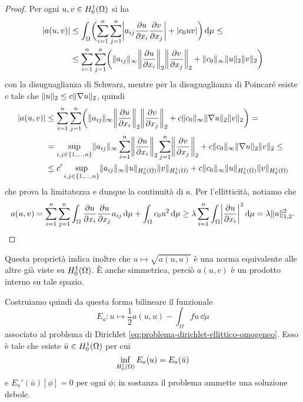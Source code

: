 \begin{proof}
    Per ogni $u,v\in\sobHc[1]{\Omega}$ si ha
    \begin{equation}
        \begin{split}
            \abs{a(u,v)}&\le
            \int_\Omega\biggl(\sum_{i=1}^n\sum_{j=1}^n\abs[\bigg]{a_{ij}\drp{u}{x_i}\drp{v}{x_j}}+\abs{c_0uv}\biggr)\,\dd\mu\le\\ &\le
            \sum_{i=1}^n\sum_{j=1}^n\biggl(\norm{a_{ij}}_\infty\norm[\bigg]{\drp{u}{x_i}}_2\norm[\bigg]{\drp{v}{x_j}}_2+\norm{c_0}_\infty\norm{u}_2\norm{v}_2\biggr)
        \end{split}
    \end{equation}
    con la disuguaglianza di Schwarz, mentre per la disuguaglianza di Poincar\'e esiste $c$ tale che $\norm{u}_2\le c\norm{\grad u}_2$, quindi
    \begin{equation}
        \begin{split}
            \abs{a(u,v)}&\le
            \sum_{i=1}^n\sum_{j=1}^n\biggl(\norm{a_{ij}}_\infty\norm[\bigg]{\drp{u}{x_i}}_2\norm[\bigg]{\drp{v}{x_j}}_2+c\norm{c_0}_\infty\norm{\grad u}_2\norm{v}_2\biggr)=\\ &=
            \sup_{i,j\in\{1,\dotsc,n\}}\norm{a_{ij}}_\infty\sum_{i=1}^n\norm[\bigg]{\drp{u}{x_i}}_2\sum_{j=1}^n\norm[\bigg]{\drp{v}{x_j}}_2+c\norm{c_0}_\infty\norm{\grad u}_2\norm{v}_2\le\\ &\le
            c'\sup_{i,j\in\{1,\dotsc,n\}}\norm{a_{ij}}_\infty\norm{u}_{\sobHc[1]{\Omega}}\norm{v}_{\sobHc[1]{\Omega}}+c\norm{c_0}_\infty\norm{u}_{\sobHc[1]{\Omega}}\norm{v}_{\sobHc[1]{\Omega}}
        \end{split}
    \end{equation}
    che prova la limitatezza e dunque la continuità di $a$.
    Per l'ellitticità, notiamo che
    \begin{equation}
        a(u,v)=
        \sum_{i=1}^n\sum_{j=1}^n\int_\Omega\drp{u}{x_i}\drp{u}{x_j}a_{ij}\,\dd\mu+\int_\Omega c_0u^2\,\dd\mu\ge
        \lambda\sum_{i=1}^n \int_\Omega\abs[\bigg]{\drp{u}{x_i}}^2\,\dd\mu=
        \lambda\norm{u}_{1,2}^2.\qedhere
    \end{equation}
\end{proof}
Questa proprietà indica inoltre che $u\mapsto\sqrt{a(u,u)}$ è una norma equivalente alle altre già viste su $\sobHc[1]{\Omega}$.
È anche simmetrica, perciò $a(u,v)$ è un prodotto interno su tale spazio.

Costruiamo quindi da questa forma bilineare il funzionale
\begin{equation}
    E_a\colon u\mapsto\frac12a(u,u)-\int_\Omega fu\,\dd\mu
    \label{eq:funzionale-energia-ellittico-dirichlet}
\end{equation}
associato al problema di Dirichlet \eqref{eq:problema-dirichlet-ellittico-omogeneo}.
Esso è tale che esiste $\bar{u}\in\sobHc[1]{\Omega}$ per cui
\begin{equation}
    \inf_{\sobHc[1]{\Omega}}E_a(u)=E_a(\bar{u})
\end{equation}
e $E_a'(\bar{u})[\phi]=0$ per ogni $\phi$; in sostanza il problema ammette una soluzione debole.
